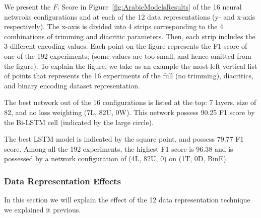 We present the $F_!$ Score in Figure~\ref{fig:ArabicModelsResults} of the 16 neural netwroks configurations and at each of the 12 data representations (y- and
x-axis respectively). The x-axis is divided into 4 strips corresponding to the 4 combinations of trimming and diacritic parameters. Then, each strip includes the 3 different encoding values. Each point on the figure represents the F1 score of one of the 192 experiments; (some values are too small, and hence omitted from the figure). To explain the figure, we take as an example the most-left
vertical list of points that represents the 16 experiments of the full (no trimming), diacritics, and binary encoding dataset representation.

The best network out of the 16 configurations is listed at the top: 7 layers, size of 82, and no loss weighting (7L, 82U, 0W). This network possess 90.25 F1 score by the Bi-LSTM cell (indicated by the large circle).

The best LSTM model is indicated by the square point, and possess 79.77 F1 score. Among all the 192 experiments, the highest F1 score is 96.38 and is possessed by a network configuration of (4L, 82U, 0) on (1T, 0D, BinE).

\subsubsection{Data Representation Effects}

In this section we will explain the effect of the 12 data representation technique we explained it previous.

